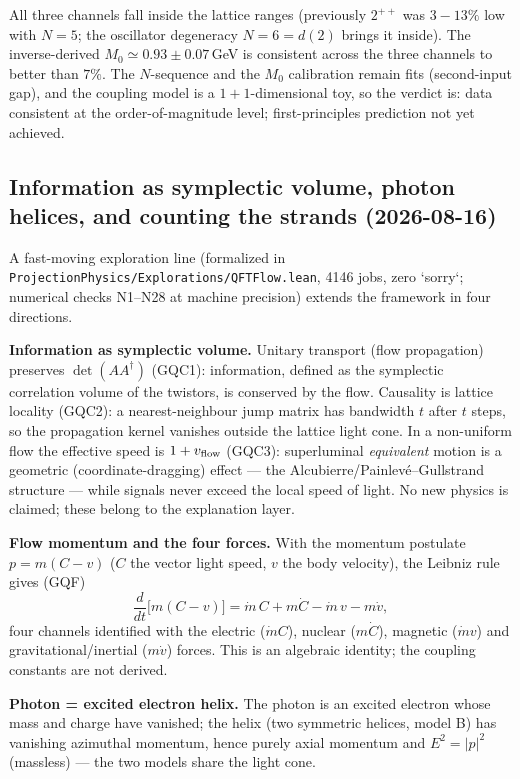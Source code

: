 \documentclass[aps,prd,preprint,superscriptaddress,amsmath,amssymb]{revtex4-2}
\begin{document}
All three channels fall inside the lattice ranges (previously $2^{++}$ was
$3{-}13\%$ low with $N=5$; the oscillator degeneracy $N=6=d(2)$ brings it
inside).  The inverse-derived $M_0\simeq0.93\pm0.07$\,GeV is consistent
across the three channels to better than $7\%$.  The $N$-sequence and the
$M_0$ calibration remain fits (second-input gap), and the coupling model is
a $1{+}1$-dimensional toy, so the verdict is: data consistent at the
order-of-magnitude level; first-principles prediction not yet achieved.

\subsection{Information as symplectic volume, photon helices, and counting the strands (2026-08-16)}

A fast-moving exploration line (formalized in
\texttt{ProjectionPhysics/Explorations/QFTFlow.lean}, 4146 jobs, zero
`sorry`; numerical checks N1--N28 at machine precision) extends the
framework in four directions.

\textbf{Information as symplectic volume.} Unitary transport (flow
propagation) preserves $\det(AA^\dagger)$ (GQC1): information, defined as
the symplectic correlation volume of the twistors, is conserved by the
flow. Causality is lattice locality (GQC2): a nearest-neighbour jump
matrix has bandwidth $t$ after $t$ steps, so the propagation kernel
vanishes outside the lattice light cone. In a non-uniform flow the
effective speed is $1+v_{\rm flow}$ (GQC3): superluminal \emph{equivalent}
motion is a geometric (coordinate-dragging) effect --- the
Alcubierre/Painlev\'e--Gullstrand structure --- while signals never exceed
the local speed of light. No new physics is claimed; these belong to the
explanation layer.

\textbf{Flow momentum and the four forces.} With the momentum postulate
$p = m(C-v)$ ($C$ the vector light speed, $v$ the body velocity), the
Leibniz rule gives (GQF)
\[
\frac{d}{dt}\big[m(C-v)\big] = \dot m\,C + m\dot C - \dot m\,v - m\dot v,
\]
four channels identified with the electric ($\dot m C$), nuclear
($m\dot C$), magnetic ($\dot m v$) and gravitational/inertial ($m\dot v$)
forces. This is an algebraic identity; the coupling constants are not
derived.

\textbf{Photon = excited electron helix.} The photon is an excited
electron whose mass and charge have vanished; the helix (two symmetric
helices, model B) has vanishing azimuthal momentum, hence purely axial
momentum and $E^2=|p|^2$ (massless) --- the two models share the light
cone.
\end{document}
